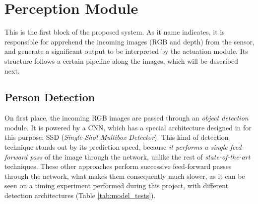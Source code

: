 \section{Perception Module}

This is the first block of the proposed system. As it name indicates, it is responsible for apprehend the incoming images (RGB and depth) from the sensor, and generate a significant output to be interpreted by the actuation module. Its structure follows a certain pipeline along the images, which will be described next.


\subsection{Person Detection}

On first place, the incoming RGB images are passed through an \emph{object detection} module. It is powered by a CNN, which has a special architecture designed in \cite{ssd} for this purpose: SSD (\emph{Single-Shot Multibox Detector}). This kind of detection technique stands out by its prediction speed, because \emph{it performs a single feed-forward pass} of the image through the network, unlike the rest of \emph{state-of-the-art} techniques. These other approaches perform successive feed-forward passes through the network, what makes them consequently much slower, as it can be seen on a timing experiment performed during this project, with different detection architectures (Table \ref{tab:model_tests}).\\

